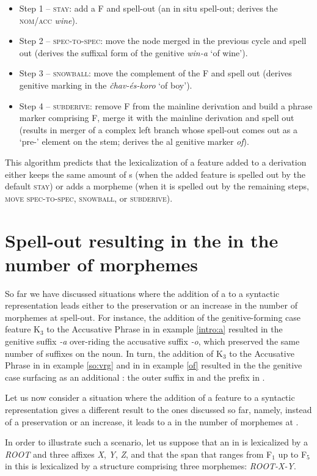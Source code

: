 \begin{itemize}
\item Step 1 -- \textsc{stay}: add a  F and spell-out (an in situ spell-out; derives the  \textsc{nom/acc} \textit{wine}).
\item Step 2 -- \textsc{spec-to-spec}: move the node merged in the previous cycle and spell out (derives the suffixal form of the  genitive \textit{win-a} `of wine').
\item Step 3 -- \textsc{snowball}: move the complement of the  F and spell out (derives genitive marking in the  \textit{\v{c}hav-\'es-koro} `of boy').
\item Step 4 -- \textsc{subderive}: remove F from the mainline derivation and build a phrase marker comprising F, merge it with the mainline derivation and spell out (results in merger of a complex left branch whose spell-out comes out as a `pre-' element on the stem; derives the  al genitive marker \textit{of}). 
\end{itemize}

This algorithm predicts that the lexicalization of a feature added to a derivation either keeps the same amount of s (when the added feature is spelled out by the default \textsc{stay}) or adds a morpheme (when it is spelled out by the remaining steps, \textsc{move spec-to-spec}, \textsc{snowball}, or \textsc{subderive}). 

\section{Spell-out resulting in the  in the number of morphemes}\label{sec:cutback}

So far we have discussed situations where the addition of a  to a syntactic representation leads either to the preservation or an increase in the number of morphemes at spell-out. For instance, the addition of the genitive-forming case feature K$_{3}$ to the Accusative Phrase in  in example \ref{intro:a} resulted in the genitive suffix \textit{-a} over-riding the accusative suffix \textit{-o}, which preserved the same number of suffixes on the noun. In turn, the addition of K$_{3}$ to the Accusative Phrase in  in example \ref{so:vrg} and in  in example \ref{of} resulted in the the genitive case surfacing as an additional : the outer suffix in  and the prefix in . 
\par
Let us now consider a situation where the addition of a feature to a syntactic representation gives a different result to the ones discussed so far, namely, instead of a preservation or an increase, it leads to a  in the number of morphemes at .
\par
In order to illustrate such a scenario, let us suppose that an  in \Next is lexicalized by a \textit{ROOT} and three affixes \textit{X}, \textit{Y}, \textit{Z}, and that the span that ranges from F$_{1}$ up to F$_{5}$ in this  is lexicalized by a structure comprising three morphemes: \textit{ROOT-X-Y}. 


